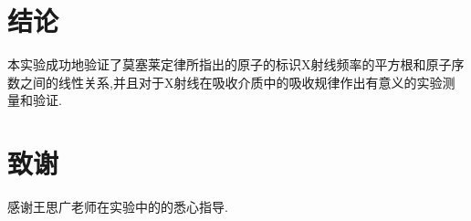\documentclass[a4paper]{article}
\begin{document}
\section{结论}\label{conclusions}
本实验成功地验证了莫塞莱定律所指出的原子的标识X射线频率的平方根和原子序数之间的线性关系,并且对于X射线在吸收介质中的吸收规律作出有意义的实验测量和验证.\\

\section{致谢}\label{acknowledgments}
感谢王思广老师在实验中的的悉心指导.

\end{document}
